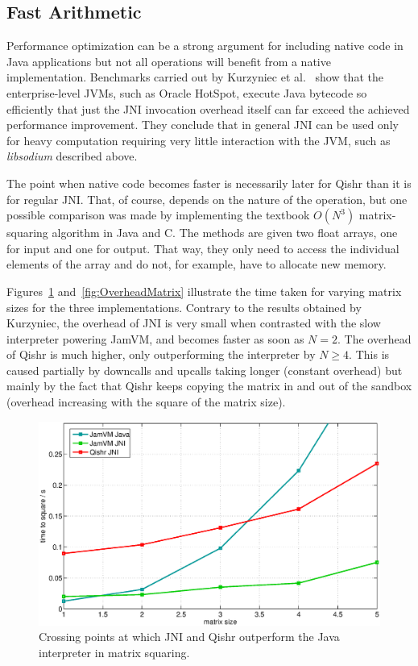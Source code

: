 \documentclass[a4paper,12pt,twoside,openright]{report}
\newcommand{\keyword}[1]{\textsf{#1}}
\newcommand{\tool}[1]{\emph{#1}}
\newcommand{\lib}[1]{\tool{lib#1}}
\begin{document}
\subsection{Fast Arithmetic}

Performance optimization can be a strong argument for including native code in Java applications but not all operations will benefit from a native implementation. Benchmarks carried out by Kurzyniec et al.~\cite{Kurzyniec01efficientcooperation} show that the enterprise-level JVMs, such as Oracle HotSpot, execute Java bytecode so efficiently that just the JNI invocation overhead itself can far exceed the achieved performance improvement. They conclude that in general JNI can be used only for heavy computation requiring very little interaction with the JVM, such as \lib{sodium} described above. 

The point when native code becomes faster is necessarily later for Qishr than it is for regular JNI. That, of course, depends on the nature of the operation, but one possible comparison was made by implementing the textbook $O(N^3)$ matrix-squaring algorithm in Java and C. The methods are given two \keyword{float} arrays, one for input and one for output. That way, they only need to access the individual elements of the array and do not, for example, have to allocate new memory. 

Figures~\ref{fig:OverheadMatrixCrossing} and~\ref{fig:OverheadMatrix} illustrate the time taken for varying matrix sizes for the three implementations. Contrary to the results obtained by Kurzyniec, the overhead of JNI is very small when contrasted with the slow interpreter powering JamVM, and becomes faster as soon as $N=2$. The overhead of Qishr is much higher, only outperforming the interpreter by $N \ge 4$. This is caused partially by downcalls and upcalls taking longer (constant overhead) but mainly by the fact that Qishr keeps copying the matrix in and out of the sandbox (overhead increasing with the square of the matrix size).

\begin{figure}[t!]
	\centering
	\includegraphics[width=1.1\textwidth]{graph_matrix_crossing.eps}
	\caption{Crossing points at which JNI and Qishr outperform the Java interpreter in matrix squaring.}
	\label{fig:OverheadMatrixCrossing}
\end{figure}
\end{document}
